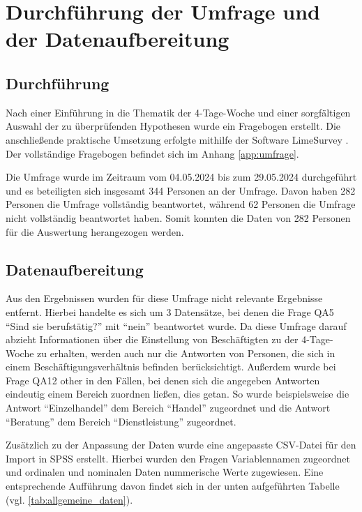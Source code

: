 \chapter{Durchführung der Umfrage und der Datenaufbereitung}


 
\section{Durchführung}

Nach einer Einführung in die Thematik der 4-Tage-Woche und einer sorgfältigen Auswahl der zu 
überprüfenden Hypothesen wurde ein Fragebogen erstellt.
Die anschließende praktische Umsetzung erfolgte mithilfe der Software LimeSurvey 
\parencite[vgl.][]{limesurvey_gmbh_limesurvey_nodate}. Der vollständige Fragebogen befindet sich im Anhang \ref{app:umfrage}.

Die Umfrage wurde im Zeitraum vom 04.05.2024 bis zum 29.05.2024 durchgeführt und es beteiligten sich
insgesamt 344 Personen an der Umfrage. Davon haben 282 Personen die Umfrage vollständig beantwortet,
während 62 Personen die Umfrage nicht vollständig beantwortet haben. Somit konnten die Daten von 282 Personen für die Auswertung herangezogen werden.

\section{Datenaufbereitung}
Aus den Ergebnissen wurden für diese Umfrage nicht relevante Ergebnisse entfernt. 
Hierbei handelte es sich um 3 Datensätze, bei denen die Frage QA5 “Sind sie berufstätig?” 
mit “nein” beantwortet wurde. Da diese Umfrage darauf abzieht Informationen über die 
Einstellung von Beschäftigten zu der 4-Tage-Woche zu erhalten, werden auch nur die 
Antworten von Personen, die sich in einem Beschäftigungsverhältnis befinden berücksichtigt. 
Außerdem wurde bei Frage QA12 other in den Fällen, bei denen sich die angegeben Antworten 
eindeutig einem Bereich zuordnen ließen, dies getan. So wurde beispielsweise die Antwort 
“Einzelhandel” dem Bereich “Handel” zugeordnet und die Antwort “Beratung” dem Bereich 
“Dienstleistung” zugeordnet.

Zusätzlich zu der Anpassung der Daten wurde eine angepasste CSV-Datei für den Import 
in \ac{SPSS} \parencite[vgl.][]{ibm_spss_nodate} erstellt. Hierbei wurden den Fragen Variablennamen zugeordnet und ordinalen 
und nominalen Daten nummerische Werte zugewiesen. Eine entsprechende Aufführung davon 
findet sich in der unten aufgeführten Tabelle (vgl. \ref{tab:allgemeine_daten}). 